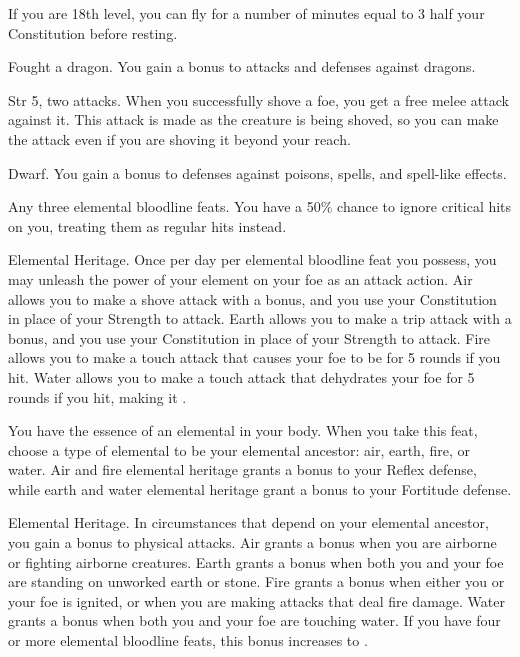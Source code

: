 If you are 18th level, you can fly for a number of minutes equal to 3 \add half your Constitution before resting.

\featpre Fought a dragon.
\featben You gain a  bonus to attacks and defenses against dragons.
\featspecial \featbanenotes

\featpre Str 5, two attacks.
\featben When you successfully shove a foe, you get a free melee attack against it.
This attack is made as the creature is being shoved, so you can make the attack even if you are shoving it beyond your reach.

\featpre Dwarf.
\featben You gain a  bonus to defenses against poisons, spells, and spell-like effects.

\featpre Any three elemental bloodline feats.
\featben You have a 50\% chance to ignore critical hits on you, treating them as regular hits instead.

\featpre Elemental Heritage.
\featben Once per day per elemental bloodline feat you possess, you may unleash the power of your element on your foe as an attack action.
Air allows you to make a shove attack with a  bonus, and you use your Constitution in place of your Strength to attack.
Earth allows you to make a trip attack with a  bonus, and you use your Constitution in place of your Strength to attack.
Fire allows you to make a touch attack that causes your foe to be \ignited for 5 rounds if you hit.
Water allows you to make a touch attack that dehydrates your foe for 5 rounds if you hit, making it \vulnerable.

\featben You have the essence of an elemental in your body.
When you take this feat, choose a type of elemental to be your elemental ancestor: air, earth, fire, or water.
Air and fire elemental heritage grants a  bonus to your Reflex defense, while earth and water elemental heritage grant a  bonus to your Fortitude defense.

\featpre Elemental Heritage.
\featben In circumstances that depend on your elemental ancestor, you gain a  bonus to physical attacks.
Air grants a bonus when you are airborne or fighting airborne creatures.
Earth grants a bonus when both you and your foe are standing on unworked earth or stone.
Fire grants a bonus when either you or your foe is ignited, or when you are making attacks that deal fire damage.
Water grants a bonus when both you and your foe are touching water.
If you have four or more elemental bloodline feats, this bonus increases to .

